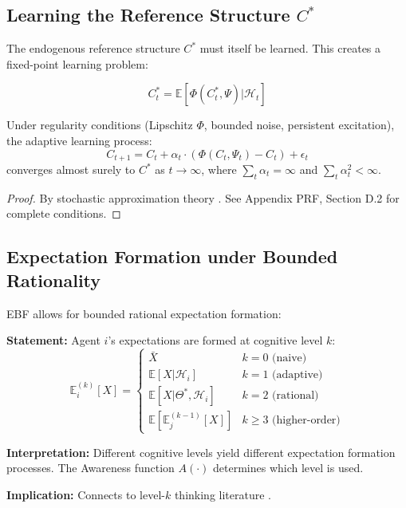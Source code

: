 \subsection{Learning the Reference Structure $C^*$}

The endogenous reference structure $C^*$ must itself be learned. This creates
a fixed-point learning problem:

\begin{equation}
C^*_t = \mathbb{E}[\Phi(C^*_t, \Psi) | \mathcal{H}_t]
\end{equation}

\begin{proposition}
Under regularity conditions (Lipschitz $\Phi$, bounded noise, persistent excitation),
the adaptive learning process:
\begin{equation}
C_{t+1} = C_t + \alpha_t \cdot (\Phi(C_t, \Psi_t) - C_t) + \epsilon_t
\end{equation}
converges almost surely to $C^*$ as $t \to \infty$, where $\sum_t \alpha_t = \infty$
and $\sum_t \alpha_t^2 < \infty$.
\end{proposition}

\begin{proof}
By stochastic approximation theory \citep{benveniste1990adaptive}.
See Appendix PRF, Section D.2 for complete conditions.
\end{proof}

\subsection{Expectation Formation under Bounded Rationality}

EBF allows for bounded rational expectation formation:

\begin{tcolorbox}[colback=gray!5!white, colframe=gray!75!black,
    title=Axiom AZ-L2: Hierarchical Expectations]
\textbf{Statement:} Agent $i$'s expectations are formed at cognitive level $k$:
\begin{equation}
\mathbb{E}^{(k)}_i[X] = \begin{cases}
\bar{X} & k = 0 \text{ (naive)} \\
\mathbb{E}[X | \mathcal{H}_i] & k = 1 \text{ (adaptive)} \\
\mathbb{E}[X | \Theta^*, \mathcal{H}_i] & k = 2 \text{ (rational)} \\
\mathbb{E}[\mathbb{E}^{(k-1)}_j[X]] & k \geq 3 \text{ (higher-order)}
\end{cases}
\end{equation}

\textbf{Interpretation:} Different cognitive levels yield different expectation
formation processes. The Awareness function $A(\cdot)$ determines which level is used.

\textbf{Implication:} Connects to level-$k$ thinking literature \citep{stahl1995players,
nagel1995unraveling}.
\end{tcolorbox}



